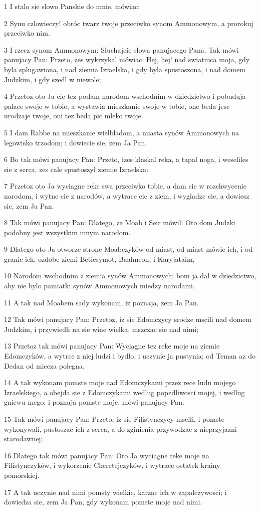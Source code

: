 \par 1 I stalo sie slowo Panskie do mnie, mówiac:
\par 2 Synu czlowieczy! obróc twarz twoje przeciwko synom Ammonowym, a prorokuj przeciwko nim.
\par 3 I rzecz synom Ammonowym: Sluchajcie slowa panujacego Pana. Tak mówi panujacy Pan: Przeto, zes wykrzykal mówiac: Hej, hej! nad swiatnica moja, gdy byla splugawiona, i nad ziemia Izraelska, i gdy byla spustoszona, i nad domem Judzkim, i gdy szedl w niewole;
\par 4 Przetoz oto Ja cie tez podam narodom wschodnim w dziedzictwo i pobuduja palace swoje w tobie, a wystawia mieszkanie swoje w tobie, one beda jesc urodzaje twoje, oni tez beda pic mleko twoje.
\par 5 I dam Rabbe na mieszkanie wielbladom, a miasta synów Ammonowych na legowisko trzodom; i dowiecie sie, zem Ja Pan.
\par 6 Bo tak mówi panujacy Pan: Przeto, izes klaskal reka, a tapal noga, i weseliles sie z serca, zes cale spustoszyl ziemie Izraelska:
\par 7 Przetoz oto Ja wyciagne reke swa przeciwko tobie, a dam cie w rozchwycenie narodom, i wytne cie z narodów, a wytrace cie z ziem, i wygladze cie, a dowiesz sie, zem Ja Pan.
\par 8 Tak mówi panujacy Pan: Dlatego, ze Moab i Seir mówil: Oto dom Judzki podobny jest wszystkim innym narodom.
\par 9 Dlatego oto Ja otworze strone Moabczyków od miast, od miast mówie ich, i od granic ich, ozdobe ziemi Betiesymot, Baalmeon, i Karyjataim,
\par 10 Narodom wschodnim z ziemia synów Ammonowych; bom ja dal w dziedzictwo, aby nie bylo pamiatki synów Ammonowych miedzy narodami.
\par 11 A tak nad Moabem sady wykonam, iz poznaja, zem Ja Pan.
\par 12 Tak mówi panujacy Pan: Przetoz, iz sie Edomczycy srodze mscili nad domem Judzkim, i przywiedli na sie wine wielka, mszczac sie nad nimi;
\par 13 Przetoz tak mówi panujacy Pan: Wyciagne tez reke moje na ziemie Edomczyków, a wytrce z niej ludzi i bydlo, i uczynie ja pustynia; od Teman az do Dedan od miecza polegna.
\par 14 A tak wykonam pomste moje nad Edomczykami przez rece ludu mojego Izraelskiego, a obejda sie z Edomczykami wedlug popedliwosci mojej, i wedlug gniewu mego; i poznaja pomste moje, mówi panujacy Pan.
\par 15 Tak mówi panujacy Pan: Przeto, iz sie Filistynczycy mscili, i pomste wykonywali, pustoszac ich z serca, a do zginienia przywodzac z nieprzyjazni starodawnej;
\par 16 Dlatego tak mówi panujacy Pan: Oto Ja wyciagne reke moje na Filistynczyków, i wykorzenie Cheretejczyków, i wytrace ostatek krainy pomorskiej.
\par 17 A tak uczynie nad nimi pomsty wielkie, karzac ich w zapalczywosci; i dowiedza sie, zem Ja Pan, gdy wykonam pomste moje nad nimi.

